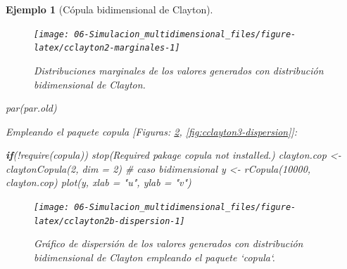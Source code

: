 \documentclass[
]{book}
\newenvironment{Shaded}{\begin{snugshade}}{\end{snugshade}}
\newcommand{\AttributeTok}[1]{\textcolor[rgb]{0.77,0.63,0.00}{#1}}
\newcommand{\CommentTok}[1]{\textcolor[rgb]{0.56,0.35,0.01}{\textit{#1}}}
\newcommand{\ControlFlowTok}[1]{\textcolor[rgb]{0.13,0.29,0.53}{\textbf{#1}}}
\newcommand{\DecValTok}[1]{\textcolor[rgb]{0.00,0.00,0.81}{#1}}
\newcommand{\FunctionTok}[1]{\textcolor[rgb]{0.00,0.00,0.00}{#1}}
\newcommand{\NormalTok}[1]{#1}
\newcommand{\OtherTok}[1]{\textcolor[rgb]{0.56,0.35,0.01}{#1}}
\newcommand{\SpecialCharTok}[1]{\textcolor[rgb]{0.00,0.00,0.00}{#1}}
\newcommand{\StringTok}[1]{\textcolor[rgb]{0.31,0.60,0.02}{#1}}
\theoremstyle{break}
\newtheorem{example}{Ejemplo}[chapter]
\theoremstyle{nonumberplain}
\begin{document}
\begin{example}[Cópula bidimensional de Clayton]
\begin{figure}[!htb]

{\centering \texttt{[image: 06-Simulacion\_multidimensional\_files/figure-latex/cclayton2-marginales-1]} 

}

\caption{Distribuciones marginales de los valores generados con distribución bidimensional de Clayton.}\label{fig:cclayton2-marginales}
\end{figure}

\begin{Shaded}
\begin{Highlighting}[]
\FunctionTok{par}\NormalTok{(par.old)}
\end{Highlighting}
\end{Shaded}

Empleando el paquete \emph{copula} {[}Figuras: \ref{fig:cclayton2b-dispersion}, \ref{fig:cclayton3-dispersion}{]}:

\begin{Shaded}
\begin{Highlighting}[]
\ControlFlowTok{if}\NormalTok{(}\SpecialCharTok{!}\FunctionTok{require}\NormalTok{(copula)) }\FunctionTok{stop}\NormalTok{(}\StringTok{\textquotesingle{}Required pakage \textasciigrave{}copula\textasciigrave{} not installed.\textquotesingle{}}\NormalTok{)}
\NormalTok{clayton.cop }\OtherTok{\textless{}{-}} \FunctionTok{claytonCopula}\NormalTok{(}\DecValTok{2}\NormalTok{, }\AttributeTok{dim =} \DecValTok{2}\NormalTok{) }\CommentTok{\# caso bidimensional}
\NormalTok{y }\OtherTok{\textless{}{-}} \FunctionTok{rCopula}\NormalTok{(}\DecValTok{10000}\NormalTok{, clayton.cop)}
\FunctionTok{plot}\NormalTok{(y, }\AttributeTok{xlab =} \StringTok{"u"}\NormalTok{, }\AttributeTok{ylab =} \StringTok{"v"}\NormalTok{)}
\end{Highlighting}
\end{Shaded}

\begin{figure}[!htb]

{\centering \texttt{[image: 06-Simulacion\_multidimensional\_files/figure-latex/cclayton2b-dispersion-1]} 

}

\caption{Gráfico de dispersión de los valores generados con distribución bidimensional de Clayton empleando el paquete `copula`.}\label{fig:cclayton2b-dispersion}
\end{figure}


\end{example}
\end{document}
